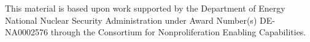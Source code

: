 This material is based upon work supported by the Department of
Energy National Nuclear Security Administration under Award
Number(s) DE-NA0002576 through the Consortium for
Nonproliferation Enabling Capabilities.